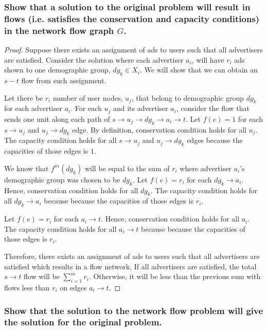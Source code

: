 \documentclass[11pt]{scrartcl}
\begin{document}
\subsubsection{
	Show that a solution to the original problem will result in flows (i.e. satisfies
	the conservation and capacity conditions) in the network flow graph $G$.
}
\begin{proof}
	Suppose there exists an assignment of ads to users such that all advertisers are satisfied.
	Consider the solution where each advertiser $a_i$, will have $r_i$ ads shown to one
	demographic group, $dg_k \in X_i$.
	We will show that we can obtain an $s-t$ flow from such assignment.

	Let there be $r_i$ number of user nodes, $u_j$, that belong to demographic group $dg_k$ for each
	advertiser $a_i$. For each $u_j$ and its advertiser $a_i$, consider the flow that sends one unit
	along each path of $s \rightarrow u_j \rightarrow dg_k \rightarrow a_i \rightarrow t$.
	Let $f(e)=1$ for each $s \rightarrow u_j$ and $u_j \rightarrow dg_k$ edge.
	By definition, conservation condition holds for all $u_j$.
	The capacity condition holds for all $s \rightarrow u_j$ and $u_j \rightarrow dg_k$ edges
	because the capacities of those edges is $1$.

	We know that $f^{in}(dg_k)$ will be equal to the sum of $r_i$ where advertiser $a_i$'s demographic group
	was chosen to be $dg_k$. Let $f(e)=r_i$ for each $dg_k \rightarrow a_i$.
	Hence, conservation condition holds for all $dg_k$.
	The capacity condition holds for all $dg_k \rightarrow a_i$ because
	because the capacities of those edges is $r_i$.

	Let $f(e)=r_i$ for each $a_i \rightarrow t$. Hence, conservation condition holds for all $a_i$.
	The capacity condition holds for all $a_i \rightarrow t$ because
	because the capacities of those edges is $r_i$.

	Therefore, there exists an assignment of ads to users such that all advertisers are satisfied
	which results in a flow network. If all advertisers are satisfied, the total $s \rightarrow t$ flow
	will be $\sum_{i=1}^m r_i$. Otherwise, it will be less than the previous sum with flows less than $r_i$
	on edges $a_i \rightarrow t$.
\end{proof}


\subsubsection{
	Show that the solution to the network flow problem will give the solution for
	the original problem.
}
\end{document}
